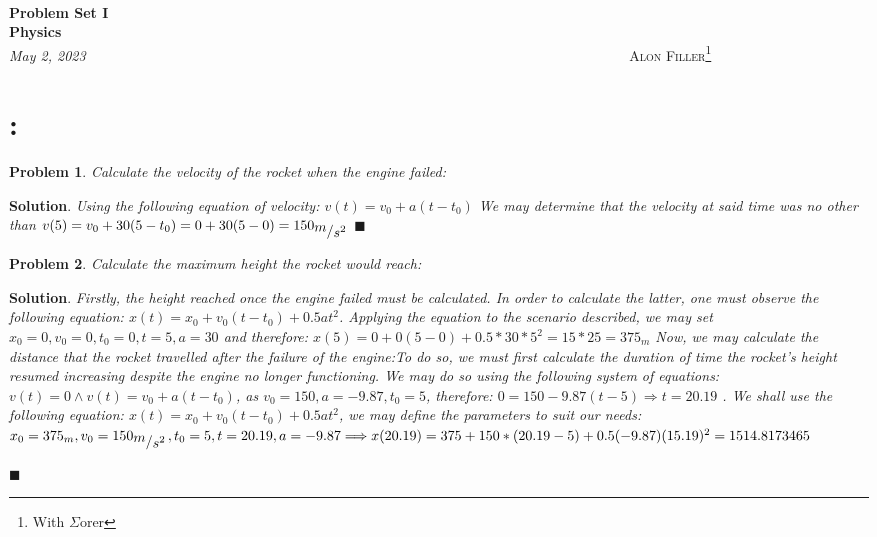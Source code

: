 \documentclass[12pt]{article}
\newcommand{\bigslant}[2]{{\raisebox{.2em}{$#1$}\left/\raisebox{-.2em}{$#2$}\right.}} %
\renewcommand{\=}[1]{\stackrel{#1}{=}} %
\newtheorem{p}{Problem}[section]
\theoremstyle{definition}
\newenvironment{s}{%
        \begin{trivlist} \item \textbf{Solution}. }{%
            \hspace*{\fill} $\blacksquare$\end{trivlist}}%
\begin{document}
{\noindent\Huge\bf  \\[0.5\baselineskip] {\selectfont  Problem Set I}         }\\[2\baselineskip] %
{ {\bf {}\selectfont Physics}\\ {\textit{\selectfont     May 2, 2023}}}~~~~~~~~~~~~~~~~~~~~~~~~~~~~~~~~~~~~~~~~~~~~~~~~~~~~~~~~~~~~~~~~~~~~~~~~~~~~~    {\large \textsc{Alon Filler}\footnote{With $\Sigma$orer}} %
\\[1.4\baselineskip] 
\section{:}
\begin{p}
  \emph{Calculate the velocity of the rocket when the engine failed:}
\end{p}
\begin{s} \newline
  \emph{Using the following equation of velocity: \newline $v(t) = v_0 + a(t - t_0)$ \newline We may determine that the velocity at said time was no other than $v(5) = v_0 + 30(5 - t_0) = 0 + 30(5 - 0) = 150_{\bigslant{m}{s^{2}}}$}
\end{s}
\begin{p}
  \emph{Calculate the maximum height the rocket would reach:}
\end{p}
\begin{s} \newline
  \emph{Firstly, the height reached once the engine failed must be calculated. In order to calculate the latter, one must observe the following equation: $x(t) = x_0 + v_0(t - t_0) + 0.5at^2$. Applying the equation to the scenario described, we may set $x_0 = 0, v_0 = 0, t_0 = 0, t = 5, a = 30$ and therefore: $x(5) = 0 + 0(5 - 0) + 0.5 * 30 * 5^2 = 15 * 25 = 375_{m}$ \newline Now, we may calculate the distance that the rocket travelled after the failure of the engine:\newline To do so, we must first calculate the duration of time the rocket's height resumed increasing despite the engine no longer functioning. \newline We may do so using the following system of equations: $v(t) = 0 \wedge v(t) = v_0 + a(t - t_0)$, as $v_0 = 150, a = -9.87, t_0 = 5$, therefore: $0 = 150 - 9.87(t - 5) \Longrightarrow t = 20.19$ \newline. We shall use the following equation: $x(t) = x_0 + v_0(t - t_0) + 0.5at^{2}$, we may define the parameters to suit our needs: $x_0 = 375_m, v_0 = 150_{\bigslant{m}{s^{2}}}, t_0 = 5, t = 20.19, a = -9.87 \Longrightarrow x(20.19) = 375 + 150 * (20.19 - 5) + 0.5(-9.87)(15.19)^2 = 1514.8173465$}

\end{s}
\end{document}
